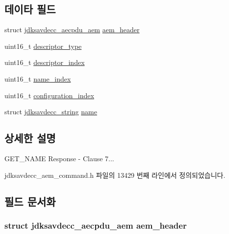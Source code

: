 \subsection*{데이타 필드}
\begin{DoxyCompactItemize}
\item 
struct \hyperlink{structjdksavdecc__aecpdu__aem}{jdksavdecc\+\_\+aecpdu\+\_\+aem} \hyperlink{structjdksavdecc__aem__command__get__name__response_ae1e77ccb75ff5021ad923221eab38294}{aem\+\_\+header}
\item 
uint16\+\_\+t \hyperlink{structjdksavdecc__aem__command__get__name__response_ab7c32b6c7131c13d4ea3b7ee2f09b78d}{descriptor\+\_\+type}
\item 
uint16\+\_\+t \hyperlink{structjdksavdecc__aem__command__get__name__response_a042bbc76d835b82d27c1932431ee38d4}{descriptor\+\_\+index}
\item 
uint16\+\_\+t \hyperlink{structjdksavdecc__aem__command__get__name__response_a898a74ada625e0b227dadb02901404e6}{name\+\_\+index}
\item 
uint16\+\_\+t \hyperlink{structjdksavdecc__aem__command__get__name__response_afaad1bd7c66f9611e134d8c5ce98f444}{configuration\+\_\+index}
\item 
struct \hyperlink{structjdksavdecc__string}{jdksavdecc\+\_\+string} \hyperlink{structjdksavdecc__aem__command__get__name__response_a7e615b51b7768e9b59bfa450051e0f8e}{name}
\end{DoxyCompactItemize}


\subsection{상세한 설명}
G\+E\+T\+\_\+\+N\+A\+ME Response -\/ Clause 7... 

jdksavdecc\+\_\+aem\+\_\+command.\+h 파일의 13429 번째 라인에서 정의되었습니다.



\subsection{필드 문서화}
\subsubsection[{\texorpdfstring{aem\+\_\+header}{aem_header}}]{\setlength{\rightskip}{0pt plus 5cm}struct {\bf jdksavdecc\+\_\+aecpdu\+\_\+aem} aem\+\_\+header}\hypertarget{structjdksavdecc__aem__command__get__name__response_ae1e77ccb75ff5021ad923221eab38294}{}\label{structjdksavdecc__aem__command__get__name__response_ae1e77ccb75ff5021ad923221eab38294}


